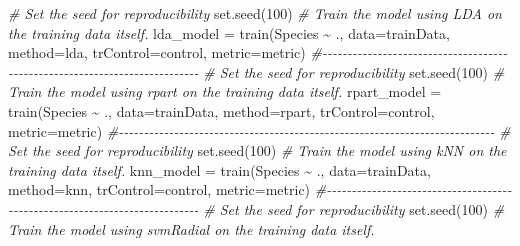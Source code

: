 \documentclass[
]{article}
\newenvironment{Shaded}{\begin{snugshade}}{\end{snugshade}}
\newcommand{\AttributeTok}[1]{\textcolor[rgb]{0.77,0.63,0.00}{#1}}
\newcommand{\CommentTok}[1]{\textcolor[rgb]{0.56,0.35,0.01}{\textit{#1}}}
\newcommand{\DecValTok}[1]{\textcolor[rgb]{0.00,0.00,0.81}{#1}}
\newcommand{\FunctionTok}[1]{\textcolor[rgb]{0.00,0.00,0.00}{#1}}
\newcommand{\NormalTok}[1]{#1}
\newcommand{\OtherTok}[1]{\textcolor[rgb]{0.56,0.35,0.01}{#1}}
\newcommand{\SpecialCharTok}[1]{\textcolor[rgb]{0.00,0.00,0.00}{#1}}
\newcommand{\StringTok}[1]{\textcolor[rgb]{0.31,0.60,0.02}{#1}}
\begin{document}
\begin{Shaded}
\begin{Highlighting}[]
\CommentTok{\# Set the seed for reproducibility}
\FunctionTok{set.seed}\NormalTok{(}\DecValTok{100}\NormalTok{)}
\CommentTok{\# Train the model using LDA on the training data itself.}
\NormalTok{lda\_model }\OtherTok{=} \FunctionTok{train}\NormalTok{(Species }\SpecialCharTok{\textasciitilde{}}\NormalTok{ ., }\AttributeTok{data=}\NormalTok{trainData, }\AttributeTok{method=}\StringTok{\textquotesingle{}lda\textquotesingle{}}\NormalTok{, }
\AttributeTok{trControl=}\NormalTok{control, }\AttributeTok{metric=}\NormalTok{metric)}
\CommentTok{\#{-}{-}{-}{-}{-}{-}{-}{-}{-}{-}{-}{-}{-}{-}{-}{-}{-}{-}{-}{-}{-}{-}{-}{-}{-}{-}{-}{-}{-}{-}{-}{-}{-}{-}{-}{-}{-}{-}{-}{-}{-}{-}{-}{-}{-}{-}{-}{-}{-}{-}{-}{-}{-}{-}{-}{-}{-}{-}{-}{-}{-}{-}{-}{-}{-}{-}{-}{-}{-}{-}{-}{-}{-}{-}{-}}
\CommentTok{\# Set the seed for reproducibility}
\FunctionTok{set.seed}\NormalTok{(}\DecValTok{100}\NormalTok{)}
\CommentTok{\# Train the model using rpart on the training data itself.}
\NormalTok{rpart\_model }\OtherTok{=} \FunctionTok{train}\NormalTok{(Species }\SpecialCharTok{\textasciitilde{}}\NormalTok{ ., }\AttributeTok{data=}\NormalTok{trainData, }\AttributeTok{method=}\StringTok{\textquotesingle{}rpart\textquotesingle{}}\NormalTok{, }
\AttributeTok{trControl=}\NormalTok{control, }\AttributeTok{metric=}\NormalTok{metric)}
\CommentTok{\#{-}{-}{-}{-}{-}{-}{-}{-}{-}{-}{-}{-}{-}{-}{-}{-}{-}{-}{-}{-}{-}{-}{-}{-}{-}{-}{-}{-}{-}{-}{-}{-}{-}{-}{-}{-}{-}{-}{-}{-}{-}{-}{-}{-}{-}{-}{-}{-}{-}{-}{-}{-}{-}{-}{-}{-}{-}{-}{-}{-}{-}{-}{-}{-}{-}{-}{-}{-}{-}{-}{-}{-}{-}{-}{-}}
\CommentTok{\# Set the seed for reproducibility}
\FunctionTok{set.seed}\NormalTok{(}\DecValTok{100}\NormalTok{)}
\CommentTok{\# Train the model using kNN on the training data itself.}
\NormalTok{knn\_model }\OtherTok{=} \FunctionTok{train}\NormalTok{(Species }\SpecialCharTok{\textasciitilde{}}\NormalTok{ ., }\AttributeTok{data=}\NormalTok{trainData, }\AttributeTok{method=}\StringTok{\textquotesingle{}knn\textquotesingle{}}\NormalTok{, }
\AttributeTok{trControl=}\NormalTok{control, }\AttributeTok{metric=}\NormalTok{metric)}
\CommentTok{\#{-}{-}{-}{-}{-}{-}{-}{-}{-}{-}{-}{-}{-}{-}{-}{-}{-}{-}{-}{-}{-}{-}{-}{-}{-}{-}{-}{-}{-}{-}{-}{-}{-}{-}{-}{-}{-}{-}{-}{-}{-}{-}{-}{-}{-}{-}{-}{-}{-}{-}{-}{-}{-}{-}{-}{-}{-}{-}{-}{-}{-}{-}{-}{-}{-}{-}{-}{-}{-}{-}{-}{-}{-}{-}{-}}
\CommentTok{\# Set the seed for reproducibility}
\FunctionTok{set.seed}\NormalTok{(}\DecValTok{100}\NormalTok{)}
\CommentTok{\# Train the model using svmRadial on the training data itself.}

\end{Highlighting}
\end{Shaded}
\end{document}
